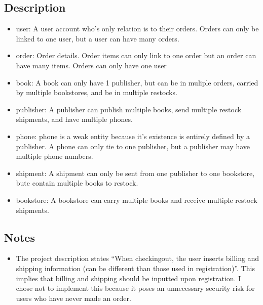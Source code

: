 \documentclass[titlepage, oneside]{article}
\begin{document}
        \subsection{Description}
            \begin{itemize}
                \item user: A user account who's only relation is to their orders. Orders can only be linked to one user, but a user can have many orders.
                \item order: Order details. Order items can only link to one order but an order can have many items. Orders can only have one user
                \item book: A book can only have 1 publisher, but can be in muliple orders, carried by multiple bookstores, and be in multiple restocks.
                \item publisher: A publisher can publish multiple books, send multiple restock shipments, and have multiple phones.
                \item phone: phone is a weak entity because it's existence is entirely defined by a publisher. A phone can only tie to one publisher, but a publisher may have multiple phone numbers.
                \item shipment: A shipment can only be sent from one publisher to one bookstore, bute contain multiple books to restock.
                \item bookstore: A bookstore can carry multiple books and receive multiple restock shipments.
            \end{itemize}
        \subsection{Notes}
            \begin{itemize}
                \item The project description states ``When checkingout,  the user inserts billing and shipping information (can be different than those used in registration)''.
                This implies that billing and shipping should be inputted upon registration. I chose not to implement this because it poses an unnecessary security risk for users who have never made an order.
            \end{itemize}
\end{document}
